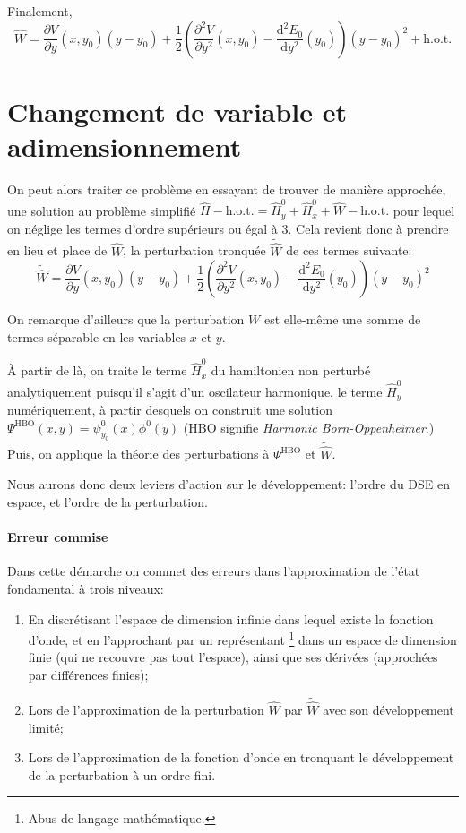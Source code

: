 \documentclass[svgnames,dvipsnames,a4paper,10pt,french]{report}
\begin{document}
Finalement,
\begin{equation}
    \boxed{\hat{W} = \frac{\partial V}{\partial y}(x,y_0)(y-y_0)  + \frac{1}{2} \left(\frac{\partial^2V}{\partial y^2}(x,y_0) -\frac{\mathrm{d}^2 E_0}{\mathrm{d}y^2}(y_0) \right)   (y-y_0)^2 + \text{h.o.t.}}
\end{equation}






\section{Changement de variable et adimensionnement}
\label{sec:chgt_var_adim}
On peut alors traiter ce problème en essayant de trouver de manière approchée, une solution au problème simplifié $\hat{H} -  \text{h.o.t.} = \hat{H}^0_y + \hat{H}^0_x + \hat{W} -  \text{h.o.t.}$  pour lequel on néglige les termes d'ordre supérieurs ou égal à 3. Cela revient donc à prendre  en lieu et place de $\hat{W}$, la perturbation tronquée $\tilde{\hat{W}}$ de ces termes suivante:
\begin{equation}
\label{W_pert_tronque}
    \tilde{\hat{W}} = \frac{\partial V}{\partial y}(x,y_0)(y-y_0)  + \frac{1}{2} \left(\frac{\partial^2V}{\partial y^2}(x,y_0) -\frac{\mathrm{d}^2 E_0}{\mathrm{d}y^2}(y_0) \right)   (y-y_0)^2 
\end{equation}

On remarque d'ailleurs que la perturbation $W$ est elle-même une somme de termes séparable en les variables $x$ et $y$.

À partir de là, on traite le terme $\hat{H}^0_x$ du hamiltonien non perturbé analytiquement puisqu'il s'agit d'un oscilateur harmonique, le terme $\hat{H}^0_y$ numériquement, à partir desquels on construit une solution $\Psi^{\text{HBO}} (x,y) = \psi^0_{y_0}(x) \phi^0(y)$ (HBO signifie \textit{Harmonic Born-Oppenheimer}.) Puis, on applique la théorie des perturbations à $\Psi^{\text{HBO}}$ et $\tilde{\hat{W}}$. 

Nous aurons donc deux leviers d'action sur le développement: l'ordre du DSE en espace, et l'ordre de la perturbation.


\paragraph{Erreur commise}
Dans cette démarche on commet des erreurs dans l'approximation de l'état fondamental à trois niveaux:
\begin{enumerate}
    \item En discrétisant l'espace de dimension infinie dans lequel existe la fonction d'onde, et en l'approchant par un \og représentant \fg{}\footnote{Abus de langage mathématique.} dans un espace de dimension finie (qui ne recouvre pas tout l'espace), ainsi que ses dérivées (approchées par différences finies);
    \item Lors de l'approximation de la perturbation $\hat{W}$ par $\tilde{\hat{W}}$ avec son développement limité;
    \item Lors de l'approximation de la fonction d'onde en tronquant le développement de la perturbation à un ordre fini.
\end{enumerate}
\end{document}
